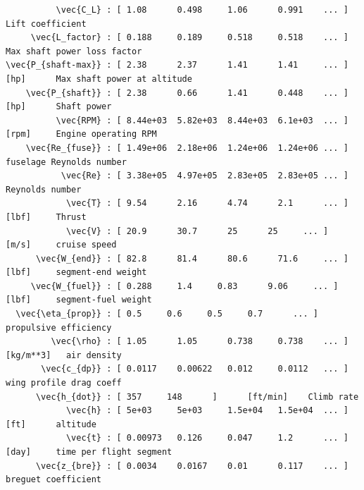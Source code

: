 \documentclass[10pt, a4paper]{article}
\begin{document}
\begin{verbatim}
          \vec{C_L} : [ 1.08      0.498     1.06      0.991    ... ]        Lift coefficient      
     \vec{L_factor} : [ 0.188     0.189     0.518     0.518    ... ]        Max shaft power loss factor     
\vec{P_{shaft-max}} : [ 2.38      2.37      1.41      1.41     ... ]  [hp]      Max shaft power at altitude     
    \vec{P_{shaft}} : [ 2.38      0.66      1.41      0.448    ... ]  [hp]      Shaft power       
          \vec{RPM} : [ 8.44e+03  5.82e+03  8.44e+03  6.1e+03  ... ]  [rpm]     Engine operating RPM        
    \vec{Re_{fuse}} : [ 1.49e+06  2.18e+06  1.24e+06  1.24e+06 ... ]        fuselage Reynolds number      
           \vec{Re} : [ 3.38e+05  4.97e+05  2.83e+05  2.83e+05 ... ]        Reynolds number     
            \vec{T} : [ 9.54      2.16      4.74      2.1      ... ]  [lbf]     Thrust      
            \vec{V} : [ 20.9      30.7      25      25     ... ]  [m/s]     cruise speed      
      \vec{W_{end}} : [ 82.8      81.4      80.6      71.6     ... ]  [lbf]     segment-end weight      
     \vec{W_{fuel}} : [ 0.288     1.4     0.83      9.06     ... ]  [lbf]     segment-fuel weight     
  \vec{\eta_{prop}} : [ 0.5     0.6     0.5     0.7      ... ]        propulsive efficiency       
         \vec{\rho} : [ 1.05      1.05      0.738     0.738    ... ]  [kg/m**3]   air density       
       \vec{c_{dp}} : [ 0.0117    0.00622   0.012     0.0112   ... ]        wing profile drag coeff     
      \vec{h_{dot}} : [ 357     148      ]      [ft/min]    Climb rate        
            \vec{h} : [ 5e+03     5e+03     1.5e+04   1.5e+04  ... ]  [ft]      altitude      
            \vec{t} : [ 0.00973   0.126     0.047     1.2      ... ]  [day]     time per flight segment     
      \vec{z_{bre}} : [ 0.0034    0.0167    0.01      0.117    ... ]        breguet coefficient


\end{verbatim}
\end{document}
